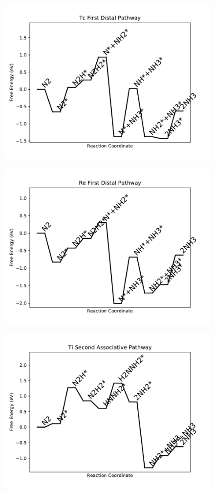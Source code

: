 \begin{figure}
\includegraphics[width=0.8\linewidth]{data/plots/Tc_distal_1.pdf}
\label{fig:Tc_distal_1}
\end{figure}

\begin{figure}
\includegraphics[width=0.8\linewidth]{data/plots/Re_distal_1.pdf}
\label{fig:Re_distal_1}
\end{figure}

\begin{figure}
\includegraphics[width=0.8\linewidth]{data/plots/Ti_associative_2.pdf}
\label{fig:Ti_associative_2}
\end{figure}


